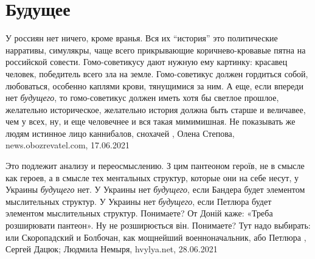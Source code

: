  
 
 
 
 
\chapter{Будущее}
\label{sec:slova.buduschee}

У россиян нет ничего, кроме вранья. Вся их \enquote{история} это политические
нарративы, симулякры, чаще всего прикрывающие коричнево-кровавые пятна на
российской совести. Гомо-советикусу дают нужную ему картинку: красавец человек,
победитель всего зла на земле. Гомо-советикус должен гордиться собой,
любоваться, особенно каплями крови, тянущимися за ним.  А еще, если впереди нет
\emph{будущего}, то гомо-советикус должен иметь хотя бы светлое прошлое, желательно
историческое, желательно история должна быть старше и величавее, чем у всех,
ну, и еще человечнее и вся такая мимимишная. Не показывать же людям истинное
лицо каннибалов, снохачей
, 
Олена Степова, news.obozrevatel.com, 17.06.2021

Это подлежит анализу и переосмыслению. З цим пантеоном героїв, не в смысле как
героев, а в смысле тех ментальных структур, которые они на себе несут, у
Украины \emph{будущего} нет. У Украины нет \emph{будущего}, если Бандера будет элементом
мыслительных структур. У Украины нет \emph{будущего}, если Петлюра будет элементом
мыслительных структур. Понимаете? От Доній каже: «Треба розширювати пантеон».
Ну не розширюється він. Понимаете? Тут надо выбирать: или Скоропадский и
Болбочан, как мощнейший военноначальник, або Петлюра
, 
Сергей Дацюк; Людмила Немыря, hvylya.net, 28.06.2021


